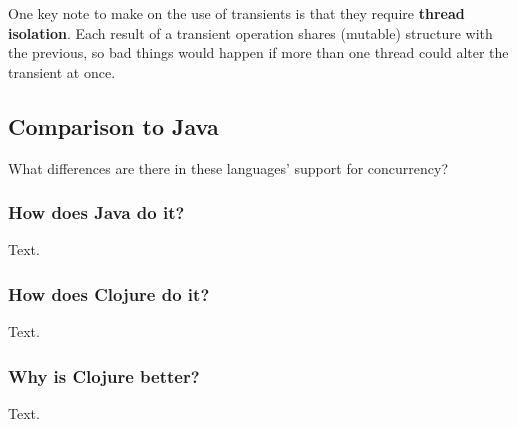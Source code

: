     One key note to make on the use of transients is that they require \textbf{thread isolation}. Each result of a transient operation shares (mutable) structure with the previous, so bad things would happen if more than one thread could alter the transient at once. \cite{website:clojure-lang-reference}

\subsection{Comparison to Java}

    What differences are there in these languages' support for concurrency?

\subsubsection{How does Java do it?}

    Text.

\subsubsection{How does Clojure do it?}

    Text.

\subsubsection{Why is Clojure better?}

    Text.
